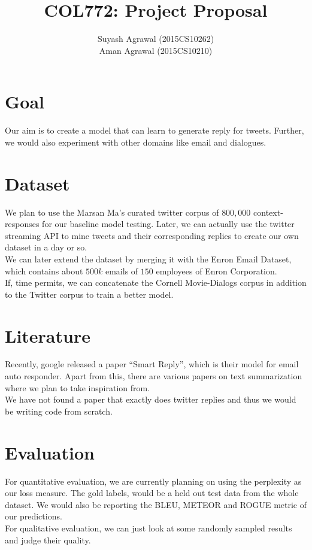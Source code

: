 \documentclass[10pt,a4paper]{article}
\title{COL772: Project Proposal}
\author{Suyash Agrawal (2015CS10262) \\ Aman Agrawal (2015CS10210)}
\begin{document}
\maketitle
\section{Goal}
    Our aim is to create a model that can learn to generate reply for tweets. Further, we would also experiment
    with other domains like email and dialogues.


\section{Dataset}
We plan to use the Marsan Ma’s curated twitter corpus of $800,000$ context-responses\cite{data:twitter-marson} for our baseline model testing. Later, we can actually use the twitter streaming API to mine tweets and their corresponding replies to create our own dataset in a day or so.\\
We can later extend the dataset by merging it with the Enron Email Dataset, which contains about $500k$ emails of $150$ employees of Enron Corporation\cite{data:enron}. \\
If, time permits, we can concatenate the Cornell Movie-Dialogs corpus \cite{data:cornell-movie} in addition to the Twitter corpus to train a better model.   

\section{Literature}
    Recently, google released a paper ``Smart Reply''\cite{paper:smartReply}, which is their model for 
    email auto responder. Apart from this, there are various papers on text summarization\cite{paper:pointer}
    where we plan to take inspiration from.\\
    We have not found a paper that exactly does twitter replies and thus we would be writing code from scratch.
\section{Evaluation}
    For quantitative evaluation, we are currently planning on using the perplexity as our loss measure. The gold
    labels, would be a held out test data from the whole dataset. We would also be reporting the BLEU, METEOR and
    ROGUE metric of our predictions.\\
    For qualitative evaluation, we can just look at some randomly sampled results and judge their quality.

    
    
\end{document}
